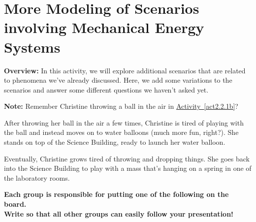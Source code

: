 \section[More Modeling with Mechanical Energy]{More Modeling of Scenarios involving Mechanical Energy Systems}
\label{act2.2.2}

\begin{overview}
	
	\textbf{Overview:} In this activity, we will explore additional scenarios that are related to phenomena we've already discussed. Here, we add some variations to the scenarios and answer some different questions we haven't asked yet.
	
\end{overview}

\noindent\textbf{Note:} Remember Christine throwing a ball in the air in \hyperref[act2.2.1b]{Activity~\ref*{act2.2.1b}}?

\begin{fnt}
	
\end{fnt}

\begin{fnt}
	
\end{fnt}

\begin{fnt}
	
\end{fnt}

\begin{fnt}
	
\end{fnt}

\noindent After throwing her ball in the air a few times, Christine is tired of playing with the ball and instead moves on to water balloons (much more fun, right?). She stands on top of the Science Building, ready to launch her water balloon.

\begin{fnt}
	
\end{fnt}

\noindent Eventually, Christine grows tired of throwing and dropping things. She goes back into the Science Building to play with a mass that's hanging on a spring in one of the laboratory rooms.

\begin{fnt}
	
\end{fnt}


\begin{center}\noindent\textbf{Each group is responsible for putting one of the following on the board.\\ Write so that all other groups can easily follow your presentation!}\end{center}


